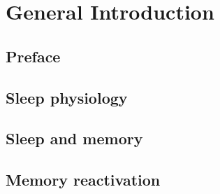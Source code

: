 \chapter{General Introduction}\label{chapter:intro}

\clearpage
  \FloatBarrier
\section{Preface}\label{Intro:sec:Preface}


\section{Sleep physiology}\label{Intro:sec:Sleep physiology}


\section{Sleep and memory}\label{Intro:sec:Sleep and memory}


\section{Memory reactivation}\label{Intro:sec:Memory reactivation}



\newpage
\thispagestyle{empty}


